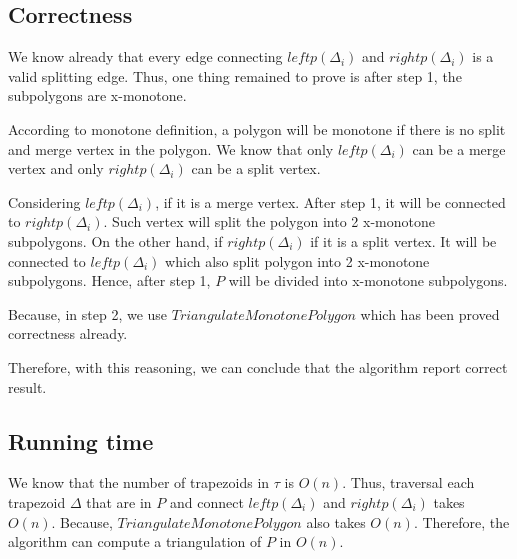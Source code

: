 \documentclass[12pt]{article}
\begin{document}
\subsection*{Correctness}
We know already that every edge connecting $leftp(\Delta_i)$ and $rightp(\Delta_i)$
is a valid splitting edge. Thus, one thing remained to prove is
after step 1, the subpolygons are x-monotone.


According to monotone definition, a polygon will be monotone if there is no
split and merge vertex in the polygon. We know that only $leftp(\Delta_i)$ can be
a merge vertex and only $rightp(\Delta_i)$ can be a split vertex.

Considering $leftp(\Delta_i)$, if it is a merge vertex. After step 1, it will be
connected to $rightp(\Delta_i)$. Such vertex will split the polygon into 2 x-monotone
subpolygons. On the other hand, if $rightp(\Delta_i)$ if it is a split vertex.
It will be connected to $leftp(\Delta_{i})$ which also split polygon into 2 x-monotone
subpolygons. Hence, after step 1, $P$ will be divided into x-monotone subpolygons.

Because, in step 2, we use $TriangulateMonotonePolygon$ which has been proved correctness already.

Therefore, with this reasoning, we can conclude that the algorithm report correct result.

\subsection*{Running time}
We know that the number of trapezoids in $\tau$ is $O(n)$. Thus, traversal each trapezoid $\Delta$ that
are in $P$ and connect $leftp(\Delta_i)$ and $rightp(\Delta_i)$ takes $O(n)$. Because,
$TriangulateMonotonePolygon$ also takes $O(n)$. Therefore, the algorithm can compute
a triangulation of $P$ in $O(n)$.
\end{document}
